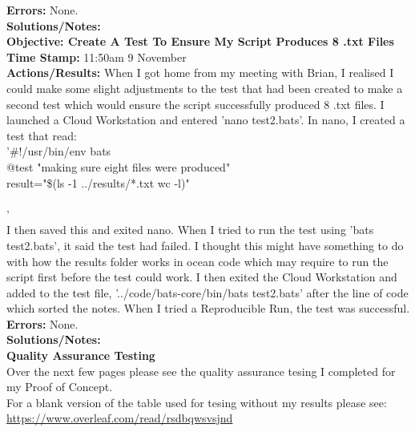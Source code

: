 \documentclass{article}
\begin{document}
\begin{FlushLeft}
\begin{itemize}
\end{itemize}
\textbf{Errors:} None.\\
\textbf{Solutions/Notes:} \\
\vspace{5mm}
\textbf{Objective: Create A Test To Ensure My Script Produces 8 .txt Files}\\ 
\textbf{Time Stamp:} 11:50am 9 November\\
\textbf{Actions/Results:} When I got home from my meeting with Brian, I realised I could make some slight adjustments to the test that had been created to make a second test which would ensure the script successfully produced 8 .txt files. I launched a Cloud Workstation and entered 'nano test2.bats'. In nano, I created a test that read:\\
'#!/usr/bin/env bats\\
@test "making sure eight files were produced" {\\
  result="\$(ls -1 ../results/*.txt \textbar{} wc -l)"\\
  [ "\$result" -eq 8 ]\\
}'\\
I then saved this and exited nano. When I tried to run the test using 'bats test2.bats', it said the test had failed. I thought this might have something to do with how the results folder works in ocean code which may require to run the script first before the test could work. I then exited the Cloud Workstation and added to the test file, '../code/bats-core/bin/bats test2.bats' after the line of code which sorted the notes. When I tried a Reproducible Run, the test was successful.\\
\textbf{Errors:} None.\\
\textbf{Solutions/Notes:} \\
\vspace{20mm}
\textbf{Quality Assurance Testing}\\
\vspace{5mm}
Over the next few pages please see the quality assurance tesing I completed for my Proof of Concept.\\
\vspace{5mm}
For a blank version of the table used for tesing without my results please see:\\
\url{https://www.overleaf.com/read/rsdbqwsvsjnd}

\pagebreak



\end{FlushLeft}
\end{document}
